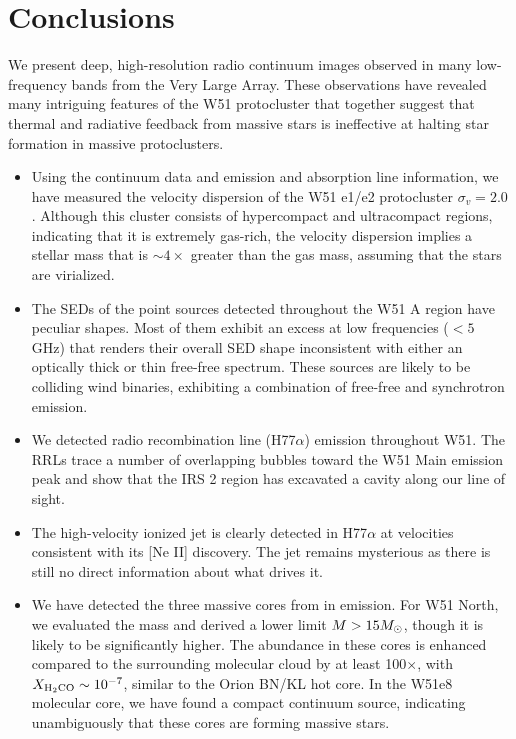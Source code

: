 \section{Conclusions}
\label{sec:conclusion}
We present deep, high-resolution radio continuum images observed in many
low-frequency bands from the Very Large Array.  These observations have
revealed many intriguing features of the W51 protocluster that together
suggest that thermal and radiative feedback from massive stars is ineffective
at halting star formation in massive protoclusters.

\begin{itemize}
    \item Using the continuum data and \formaldehyde emission and absorption line
information, we have measured the velocity dispersion of the W51 e1/e2
protocluster $\sigma_v=2.0$ \kms.  Although this cluster consists of
hypercompact and ultracompact \hii regions, indicating that it is extremely
gas-rich, the velocity dispersion implies a stellar mass that is $\sim4\times$
greater than the gas mass, assuming that the stars are virialized.

\item The SEDs of the point sources detected throughout the W51 A region have
peculiar shapes.  Most of them exhibit an excess at low frequencies ($<5$ GHz)
that renders their overall SED shape inconsistent with either an optically
thick or thin free-free spectrum.  These sources are likely to be colliding
wind binaries, exhibiting a combination of free-free and synchrotron emission.


\item We detected radio recombination line (H77$\alpha$) emission throughout
    W51.  The RRLs trace a number of overlapping bubbles toward the W51 Main
    emission peak and show that the IRS 2 region has excavated a cavity along
    our line of sight.  

\item The \citet{Lacy2007a} high-velocity ionized jet is clearly detected in
    H77$\alpha$ at velocities consistent with its [Ne II] discovery.
    The jet remains mysterious as there is still no direct information about
    what drives it.  

\item We have detected the three massive cores from \citet{Zhang1997a} in
\formaldehyde \twotwo emission.  For W51 North, we evaluated the mass and
derived a lower limit $M>15 M_{\odot}$, though it is likely to be significantly
higher.  The \formaldehyde abundance in these cores is enhanced compared to the
surrounding molecular cloud by at least 100$\times$, with $X_{\textrm{H}_2\textrm{CO}}
\sim 10^{-7}$, similar to the Orion BN/KL hot core.  In the W51e8 molecular
core, we have found a compact continuum source, indicating unambiguously that
these cores are forming massive stars.


\end{itemize}
